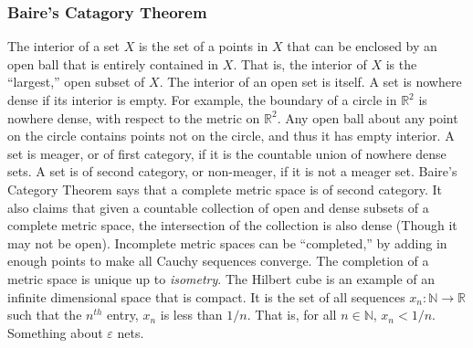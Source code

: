 \documentclass[crop=false,class=book,oneside]{standalone}
\begin{document}
            \subsubsection{Baire's Catagory Theorem}
                The interior of a set $X$ is the set of a points
                in $X$ that can be enclosed by an open ball that
                is entirely contained in $X$. That is, the interior
                of $X$ is the ``largest,'' open subset of $X$.
                The interior of an open set is itself. A set is
                nowhere dense if its interior is empty. For example, the boundary of a circle
                in $\mathbb{R}^{2}$ is nowhere dense, with respect to
                the metric on $\mathbb{R}^{2}$. Any open ball about any point
                on the circle contains points not on the circle, and thus
                it has empty interior. A set is meager, or of first
                category, if it is the countable union of nowhere dense
                sets. A set is of second category, or non-meager, if
                it is not a meager set. Baire's Category Theorem says that
                a complete metric space is of second category. It also claims
                that given a countable collection of open and dense subsets
                of a complete metric space, the intersection of the collection
                is also dense (Though it may not be open). Incomplete
                metric spaces can be ``completed,'' by adding in enough
                points to make all Cauchy sequences converge. The
                completion of a metric space is unique up to
                \textit{isometry}. The Hilbert cube is an example of
                an infinite dimensional space that is compact.
                It is the set of all sequences
                $x_{n}:\mathbb{N}\rightarrow\mathbb{R}$ such that the
                $n^{th}$ entry, $x_{n}$ is less than $1/n$. That is,
                for all $n\in\mathbb{N}$, $x_{n}<1/n$.
                Something about $\varepsilon$ nets.
\end{document}
